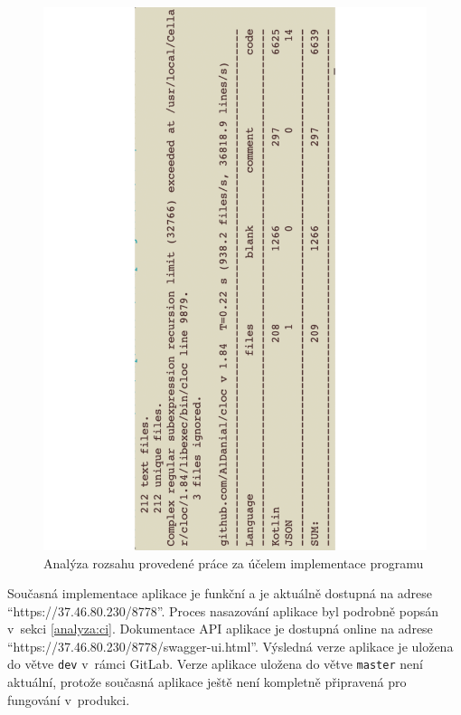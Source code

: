         \begin{figure}\centering
        	   \includegraphics[angle=-90, width=1.0\textwidth]{pdfs/CodeAmountImpl2}
        	   \caption[Analýza kódu implementace]{Analýza rozsahu provedené práce za účelem implementace programu}\label{image:code-count-main}
        \end{figure}
        
        Současná implementace aplikace je funkční a je aktuálně dostupná na adrese \enquote{https://37.46.80.230/8778}. Proces nasazování aplikace byl podrobně popsán v~sekci \ref{analyza:ci}. Dokumentace API aplikace je dostupná online na adrese \enquote{https://37.46.80.230/8778/swagger-ui.html}. Výsledná verze aplikace je uložena do větve \verb|dev| v~rámci GitLab.
        Verze aplikace uložena do větve \verb|master| není aktuální, protože současná aplikace ještě není kompletně připravená pro fungování v~produkci.
        
